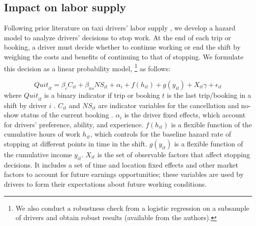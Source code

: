 \documentclass[reviewmode,AEJ]{AEA}
\begin{document}
\subsection{Impact on labor supply}
Following prior literature on taxi drivers' labor supply \citep{farber2005tomorrow,farber2015you,agarwal2015singaporean}%
, we develop a hazard model to analyze drivers' decisions to stop work. At the end of each trip or booking, a driver must decide whether
to continue working or end the shift by weighing the costs and benefits of continuing to that of stopping. 
We formulate this decision as a linear probability model,%
\footnote{%
We also conduct a robustness check from a logistic regression on a subsample of drivers and obtain robust results (available from the authors).} as follows:

\begin{equation}
\label{eq:quit}
{Quit}_{it} = \beta_{c}C_{it} + \beta_{ns} {NS}_{it} + \alpha_i +  f(h_{it}) + g(y_{it}) + X_{it}\gamma  +  \epsilon_{it}
\end{equation}
where %
${Quit}_{it}$ is a binary indicator 
 if trip or booking $t$ is the last trip/booking in a shift by driver $i$%
. $C_{it}$ and ${NS}_{it}$ are indicator variables for
the cancellation and no-show status of the current booking%
. $\alpha_i$ is the driver fixed effects, 
which account for drivers' preference, ability, and experience.
$f(h_{it})$ is a flexible function of the cumulative hours of work $h_{it}$, which controls for the baseline 
hazard rate of stopping at different points in time in the shift. $g(y_{it})$ is a flexible function 
of the cumulative income $y_{it}$.
$X_{it}$ is the set of observable factors that affect stopping decisions.  
It includes a set of time and location fixed effects and other market factors to account for 
future earnings opportunities; these variables are used by drivers to form their expectations 
about future working conditions.
\end{document}

